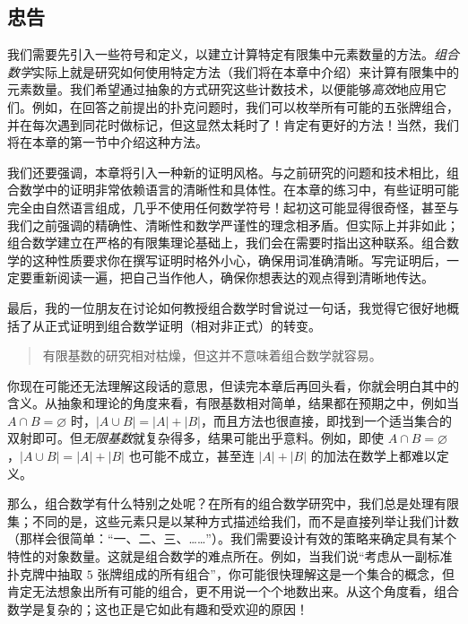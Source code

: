 
\subsection{忠告}

我们需要先引入一些符号和定义，以建立计算特定有限集中元素数量的方法。\emph{组合数学}实际上就是研究如何使用特定方法（我们将在本章中介绍）来计算有限集中的元素数量。我们希望通过抽象的方式研究这些计数技术，以便能够\emph{高效}地应用它们。例如，在回答之前提出的扑克问题时，我们可以枚举所有可能的五张牌组合，并在每次遇到同花时做标记，但这显然太耗时了！肯定有更好的方法！当然，我们将在本章的第一节中介绍这种方法。

我们还要强调，本章将引入一种新的证明风格。与之前研究的问题和技术相比，组合数学中的证明非常依赖语言的清晰性和具体性。在本章的练习中，有些证明可能完全由自然语言组成，几乎不使用任何数学符号！起初这可能显得很奇怪，甚至与我们之前强调的精确性、清晰性和数学严谨性的理念相矛盾。但实际上并非如此；组合数学建立在严格的有限集理论基础上，我们会在需要时指出这种联系。组合数学的这种性质要求你在撰写证明时格外小心，确保用词准确清晰。写完证明后，一定要重新阅读一遍，把自己当作他人，确保你想表达的观点得到清晰地传达。

最后，我的一位朋友在讨论如何教授组合数学时曾说过一句话，我觉得它很好地概括了从正式证明到组合数学证明（相对非正式）的转变。
\begin{quotation}
    有限基数的研究相对枯燥，但这并不意味着组合数学就容易。
\end{quotation}
你现在可能还无法理解这段话的意思，但读完本章后再回头看，你就会明白其中的含义。从抽象和理论的角度来看，有限基数相对简单，结果都在预期之中，例如当 $A \cap B = \varnothing$ 时，$|A \cup B| = |A|+|B|$，而且方法也很直接，即找到一个适当集合的双射即可。但\emph{无限基数}就复杂得多，结果可能出乎意料。例如，即使 $A \cap B = \varnothing$，$|A \cup B| = |A|+|B|$ 也可能不成立，甚至连 $|A|+|B|$ 的加法在数学上都难以定义。

那么，组合数学有什么特别之处呢？在所有的组合数学研究中，我们总是处理有限集；不同的是，这些元素只是以某种方式描述给我们，而不是直接列举让我们计数（那样会很简单：``一、二、三、……''）。我们需要设计有效的策略来确定具有某个特性的对象数量。这就是组合数学的难点所在。例如，当我们说``考虑从一副标准扑克牌中抽取 $5$ 张牌组成的所有组合''，你可能很快理解这是一个集合的概念，但肯定无法想象出所有可能的组合，更不用说一个个地数出来。从这个角度看，组合数学是复杂的；这也正是它如此有趣和受欢迎的原因！

